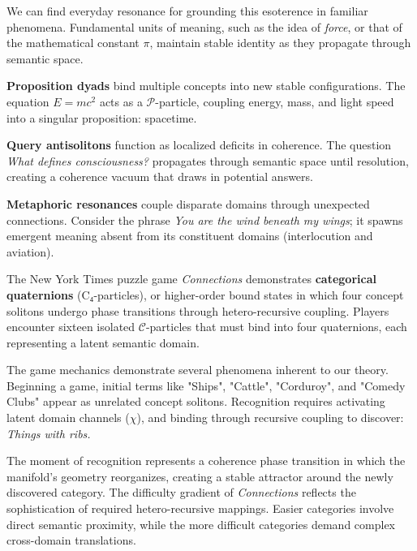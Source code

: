 We can find everyday resonance for grounding this esoterence in familiar phenomena. Fundamental units of meaning, such as the idea of \textit{force}, or that of the mathematical constant \(\pi\), maintain stable identity as they propagate through semantic space.

\textbf{Proposition dyads} bind multiple concepts into new stable configurations. The equation \(E = mc^2\) acts as a \(\mathcal{P}\)-particle, coupling energy, mass, and light speed into a singular proposition: spacetime.

\textbf{Query antisolitons} function as localized deficits in coherence. The question \textit{What defines consciousness?} propagates through semantic space until resolution, creating a coherence vacuum that draws in potential answers.

\textbf{Metaphoric resonances} couple disparate domains through unexpected connections. Consider the phrase \textit{You are the wind beneath my wings}; it spawns emergent meaning absent from its constituent domains (interlocution and aviation).


The New York Times puzzle game \textit{Connections} demonstrates \textbf{categorical quaternions} (C₄-particles), or higher-order bound states in which four concept solitons undergo phase transitions through hetero-recursive coupling. Players encounter sixteen isolated \(\mathcal{C}\)-particles that must bind into four quaternions, each representing a latent semantic domain.

The game mechanics demonstrate several phenomena inherent to our theory. Beginning a game, initial terms like "Ships", "Cattle", "Corduroy", and "Comedy Clubs" appear as unrelated concept solitons. Recognition requires activating latent domain channels (\(\chi\)), and binding through recursive coupling to discover: \textit{Things with ribs.} 

The moment of recognition represents a coherence phase transition in which the manifold's geometry reorganizes, creating a stable attractor around the newly discovered category. The difficulty gradient of \textit{Connections} reflects the sophistication of required hetero-recursive mappings. Easier categories involve direct semantic proximity, while the more difficult categories demand complex cross-domain translations.


